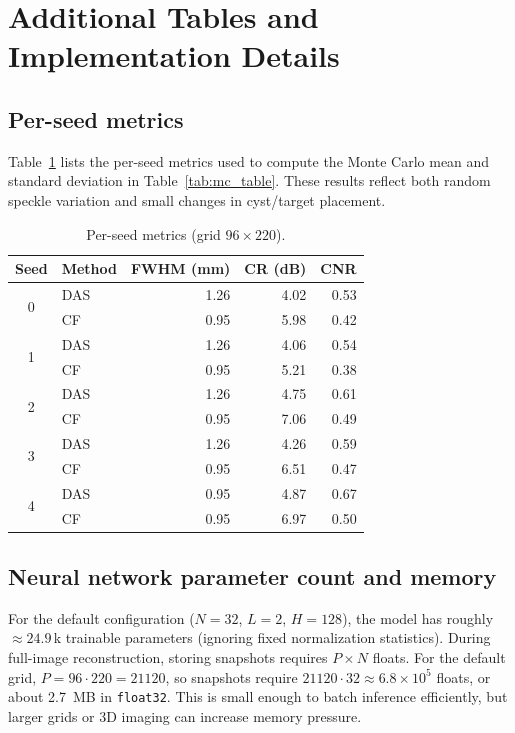 \documentclass[conference]{IEEEtran}
\begin{document}
\section{Additional Tables and Implementation Details}
\subsection{Per-seed metrics}
Table~\ref{tab:per_seed} lists the per-seed metrics used to compute the Monte Carlo mean and standard deviation in Table~\ref{tab:mc_table}. These results reflect both random speckle variation and small changes in cyst/target placement.

\begin{table}[t]
\centering
\caption{Per-seed metrics (grid $96\times 220$).}
\label{tab:per_seed}
\begin{tabular}{c l r r r}
\toprule
Seed & Method & FWHM (mm) & CR (dB) & CNR \\
\midrule
\multirow{2}{*}{0} & DAS & 1.26 & 4.02 & 0.53 \\
 & CF  & 0.95 & 5.98 & 0.42 \\
\multirow{2}{*}{1} & DAS & 1.26 & 4.06 & 0.54 \\
 & CF  & 0.95 & 5.21 & 0.38 \\
\multirow{2}{*}{2} & DAS & 1.26 & 4.75 & 0.61 \\
 & CF  & 0.95 & 7.06 & 0.49 \\
\multirow{2}{*}{3} & DAS & 1.26 & 4.26 & 0.59 \\
 & CF  & 0.95 & 6.51 & 0.47 \\
\multirow{2}{*}{4} & DAS & 0.95 & 4.87 & 0.67 \\
 & CF  & 0.95 & 6.97 & 0.50 \\
\bottomrule
\end{tabular}
\end{table}

\subsection{Neural network parameter count and memory}
For the default configuration ($N=32$, $L=2$, $H=128$), the model has roughly $\approx 24.9\,$k trainable parameters (ignoring fixed normalization statistics). During full-image reconstruction, storing snapshots requires $P\times N$ floats. For the default grid, $P=96\cdot 220=21120$, so snapshots require $21120\cdot 32\approx 6.8\times 10^5$ floats, or about \SI{2.7}{MB} in \texttt{float32}. This is small enough to batch inference efficiently, but larger grids or 3D imaging can increase memory pressure.
\end{document}
